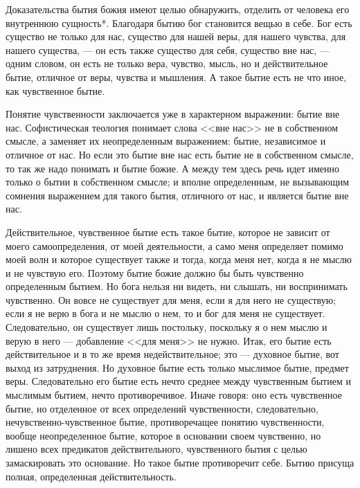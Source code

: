 \documentclass[12pt,oneside]{book}
\begin{document}
Доказательства бытия божия имеют целью обнаружить, отделить от человека его внутреннюю сущность*\let\svthefootnote\thefootnote\let\thefootnote\relax{}\let\thefootnote\svthefootnote. Благодаря бытию бог становится вещью в себе. Бог есть существо не только для нас, существо для нашей веры, для нашего чувства, для нашего существа, --- он есть также существо для себя, существо вне нас, --- одним словом, он есть не только вера, чувство, мысль, но и действительное бытие, отличное от веры, чувства и мышления. А такое бытие есть не что иное, как чувственное бытие.



Понятие чувственности заключается уже в характерном выражении: бытие вне нас. Софистическая теология понимает слова <<вне нас>> не в собственном смысле, а заменяет их неопределенным выражением: бытие, независимое и отличное от нас. Но если это бытие вне нас есть бытие не в собственном смысле, то так же надо понимать и бытие божие. А между тем здесь речь идет именно только о бытии в собственном смысле; и вполне определенным, не вызывающим сомнения выражением для такого бытия, отличного от нас, и является бытие вне нас.

Действительное, чувственное бытие есть такое бытие, которое не зависит от моего самоопределения, от моей деятельности, а само меня определяет помимо моей волн и которое существует также и тогда, когда меня нет, когда я не мыслю и не чувствую его. Поэтому бытие божие должно бы быть чувственно определенным бытием. Но бога нельзя ни видеть, ни слышать, ни воспринимать чувственно. Он вовсе не существует для меня, если я для него не существую; если я не верю в бога и не мыслю о нем, то и бог для меня не существует. Следовательно, он существует лишь постольку, поскольку я о нем мыслю и верую в него --- добавление <<для меня>> не нужно. Итак, его бытие есть действительное и в то же время недействительное; это --- духовное бытие, вот выход из затруднения. Но духовное бытие есть только мыслимое бытие, предмет веры. Следовательно его бытие есть нечто среднее между чувственным бытием и мыслимым бытием, нечто противоречивое. Иначе говоря: оно есть чувственное бытие, но отделенное от всех определений чувственности, следовательно, нечувственно-чувственное бытие, противоречащее понятию чувственности, вообще неопределенное бытие, которое в основании своем чувственно, но лишено всех предикатов действительного, чувственного бытия с целью замаскировать это основание. Но такое бытие противоречит себе. Бытию присуща полная, определенная действительность.
\end{document}
